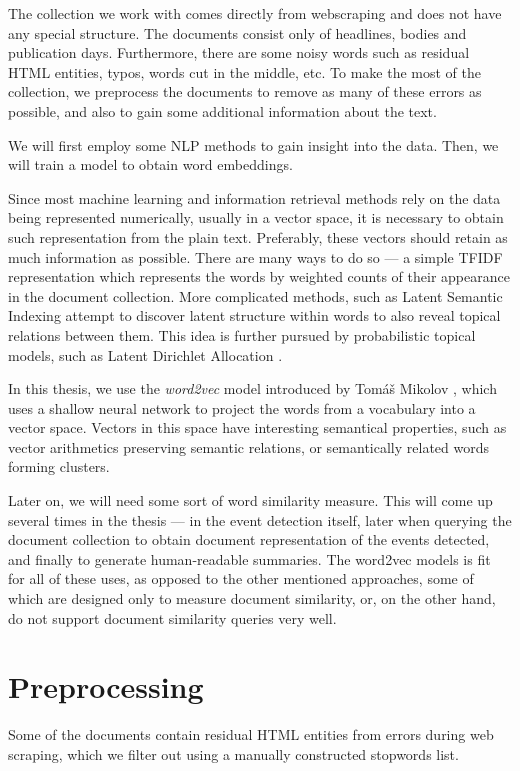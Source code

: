 The collection we work with comes directly from webscraping and does not have any special structure. The documents consist only of headlines, bodies and publication days. Furthermore, there are some noisy words such as residual HTML entities, typos, words cut in the middle, etc. To make the most of the collection, we preprocess the documents to remove as many of these errors as possible, and also to gain some additional information about the text.

We will first employ some NLP methods to gain insight into the data. Then, we will train a model to obtain word embeddings.

Since most machine learning and information retrieval methods rely on the data being represented numerically, usually in a vector space, it is necessary to obtain such representation from the plain text. Preferably, these vectors should retain as much information as possible. There are many ways to do so --- a simple TFIDF representation \cite{information-retrieval} which represents the words by weighted counts of their appearance in the document collection. More complicated methods, such as Latent Semantic Indexing \cite{lsi} attempt to discover latent structure within words to also reveal topical relations between them. This idea is further pursued by probabilistic topical models, such as Latent Dirichlet Allocation \cite{lda}.

In this thesis, we use the \textit{word2vec} model introduced by Tomáš Mikolov \cite{distributed-representations, linguistic-regularities, word2vec}, which uses a shallow neural network to project the words from a vocabulary into a vector space. Vectors in this space have interesting semantical properties, such as vector arithmetics preserving semantic relations, or semantically related words forming clusters.

Later on, we will need some sort of word similarity measure. This will come up several times in the thesis --- in the event detection itself, later when querying the document collection to obtain document representation of the events detected, and finally to generate human-readable summaries. The word2vec models is fit for all of these uses, as opposed to the other mentioned approaches, some of which are designed only to measure document similarity, or, on the other hand, do not support document similarity queries very well.


\section{Preprocessing}
Some of the documents contain residual HTML entities from errors during web scraping, which we filter out using a manually constructed stopwords list.

